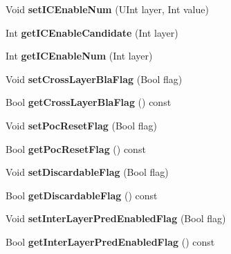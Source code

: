 \begin{DoxyCompactItemize}
Void {\bfseries set\+I\+C\+Enable\+Num} (U\+Int layer, Int value)
\item 
\mbox{\label{class_t_com_slice_afc100ab4a82e97ca22071e6029f9ef08}} 
Int {\bfseries get\+I\+C\+Enable\+Candidate} (Int layer)
\item 
\mbox{\label{class_t_com_slice_a9dffd1274079afd2d4b03d86f7f214d9}} 
Int {\bfseries get\+I\+C\+Enable\+Num} (Int layer)
\item 
\mbox{\label{class_t_com_slice_ac25b66236a05971404afa3af06ae7a9c}} 
Void {\bfseries set\+Cross\+Layer\+Bla\+Flag} (Bool flag)
\item 
\mbox{\label{class_t_com_slice_ab2ea64596c7f56a6e5dfb24db9849001}} 
Bool {\bfseries get\+Cross\+Layer\+Bla\+Flag} () const
\item 
\mbox{\label{class_t_com_slice_a34bb5171e09d1993a9de36943fb77a9d}} 
Void {\bfseries set\+Poc\+Reset\+Flag} (Bool flag)
\item 
\mbox{\label{class_t_com_slice_a0bde7c9a77b1b13a0d777c05e434e46f}} 
Bool {\bfseries get\+Poc\+Reset\+Flag} () const
\item 
\mbox{\label{class_t_com_slice_aa9e85088c6e3a71c00fdef4e5930cea6}} 
Void {\bfseries set\+Discardable\+Flag} (Bool flag)
\item 
\mbox{\label{class_t_com_slice_a5cd5953922ed1ce28db3719685d271c7}} 
Bool {\bfseries get\+Discardable\+Flag} () const
\item 
\mbox{\label{class_t_com_slice_a1ee1b673702b29284a50f2d6d1409e28}} 
Void {\bfseries set\+Inter\+Layer\+Pred\+Enabled\+Flag} (Bool flag)
\item 
\mbox{\label{class_t_com_slice_a3bcdd33260df3d4498746b8e55c09c03}} 
Bool {\bfseries get\+Inter\+Layer\+Pred\+Enabled\+Flag} () const
\item 
\mbox{\label{class_t_com_slice_a037ec3889ebe17af088d22e16f8ae718}} 

\end{DoxyCompactItemize}
